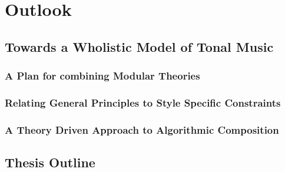 \chapter{Outlook}
    \section{Towards a Wholistic Model of Tonal Music}
        \subsection{A Plan for combining Modular Theories}
        \subsection{Relating General Principles to Style Specific Constraints}
        \subsection{A Theory Driven Approach to Algorithmic Composition}
    \section{Thesis Outline}